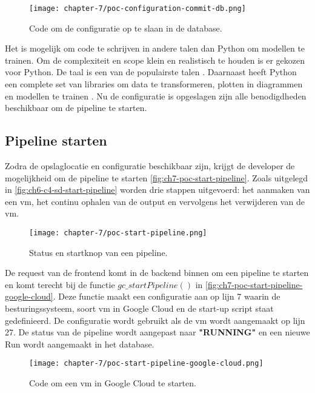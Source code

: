 \begin{figure}[hbt!]
  \centering
  \texttt{[image: chapter-7/poc-configuration-commit-db.png]}
  \caption{Code om de configuratie op te slaan in de database.}
  \label{fig:ch7-poc-configuration-commit-db}
\end{figure}

Het is mogelijk om code te schrijven in andere talen dan Python om modellen te trainen. Om de complexiteit en scope klein en realistisch te houden is er gekozen voor Python. De taal is een van de populairste talen \cite{stack-overflow-survey-2020-loved-dreaded-framework-libraries-tools}. Daarnaast heeft Python een complete set van libraries om data te transformeren, plotten in diagrammen en modellen te trainen \cite{python-libraries}. Nu de configuratie is opgeslagen zijn alle benodigdheden beschikbaar om de pipeline te starten. 

\subsection{Pipeline starten}\label{subsec:ch7-pipeline-starten}
Zodra de opslaglocatie en configuratie beschikbaar zijn, krijgt de developer de mogelijkheid om de pipeline te starten \autoref{fig:ch7-poc-start-pipeline}. Zoals uitgelegd in \autoref{fig:ch6-c4-sd-start-pipeline} worden drie stappen uitgevoerd: het aanmaken van een \acrshort{vm}, het continu ophalen van de output en vervolgens het verwijderen van de \acrshort{vm}.

\begin{figure}[hbt!]
  \centering
  \texttt{[image: chapter-7/poc-start-pipeline.png]}
  \caption{Status en startknop van een pipeline.}
  \label{fig:ch7-poc-start-pipeline}
\end{figure}

De request van de frontend komt in de backend binnen om een pipeline te starten en komt terecht bij de functie \(gc\_startPipeline()\) in \autoref{fig:ch7-poc-start-pipeline-google-cloud}. Deze functie maakt een configuratie aan op lijn 7 waarin de besturingssysteem, soort \acrshort{vm} in Google Cloud en de start-up script staat gedefinieerd. De configuratie wordt gebruikt als de \acrshort{vm} wordt aangemaakt op lijn 27. De status van de pipeline wordt aangepast naar \textbf{"RUNNING"} en een nieuwe Run wordt aangemaakt in het database.

\begin{figure}[hbt!]
  \centering
  \texttt{[image: chapter-7/poc-start-pipeline-google-cloud.png]}
  \caption{Code om een \acrfull{vm} in Google Cloud te starten.}
  \label{fig:ch7-poc-start-pipeline-google-cloud}
\end{figure}

